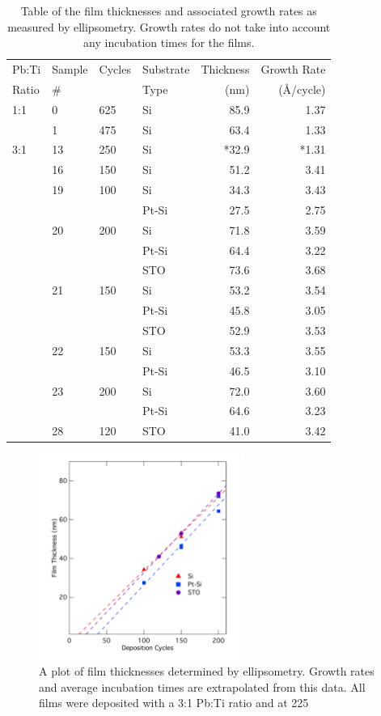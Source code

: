 \begin{table}[tbp]
	\centering
	\small
	\caption[Sample Thicknesses and Growth Rates]%
		{Table of the film thicknesses and associated growth rates as measured by ellipsometry. Growth rates do %
		not take into account any incubation times for the films.}
	\label{tbl:LoThicknesses}
	\begin{tabular}{llllrr}
		\toprule
		Pb:Ti		&Sample	&Cycles		&Substrate	&Thickness	&Growth Rate	\\
		Ratio	&\#		&			&Type		&(nm)		&(\AA/cycle)	\\ \midrule
		1:1		&0		&625		&Si			&85.9		&1.37		\\
				&1		&475		&Si			&63.4		&1.33		\\
		3:1		&13		&250		&Si			&*32.9		&*1.31		\\
				&16		&150		&Si			&51.2		&3.41		\\
				&19		&100		&Si			&34.3		&3.43		\\
				&		&			&Pt-Si		&27.5		&2.75		\\
				&20		&200		&Si			&71.8		&3.59		\\
				&		&			&Pt-Si		&64.4		&3.22		\\
				&		&			&STO		&73.6		&3.68		\\
				&21		&150		&Si			&53.2		&3.54		\\
				&		&			&Pt-Si		&45.8		&3.05		\\
				&		&			&STO		&52.9		&3.53		\\
				&22		&150		&Si			&53.3		&3.55		\\
				&		&			&Pt-Si		&46.5		&3.10		\\
				&23		&200		&Si			&72.0		&3.60		\\
				&		&			&Pt-Si		&64.6		&3.23		\\
				&28		&120		&STO		&41.0		&3.42		\\	
		\bottomrule
	\end{tabular}
\end{table}

\begin{figure}[htbp]
	\centering
	\includegraphics[width=0.6\textwidth]{./Figures/Data/Ellipsometry/Ellip-Rates}
	\caption[Film Thicknesses vs. Deposition Cycles]%
		{A plot of film thicknesses determined by ellipsometry. Growth rates and average incubation times are %
		extrapolated from this data. All films were deposited with a 3:1 Pb:Ti ratio and at 225\degC{}}
	\label{fig:Ellip-rates}
\end{figure}
	
